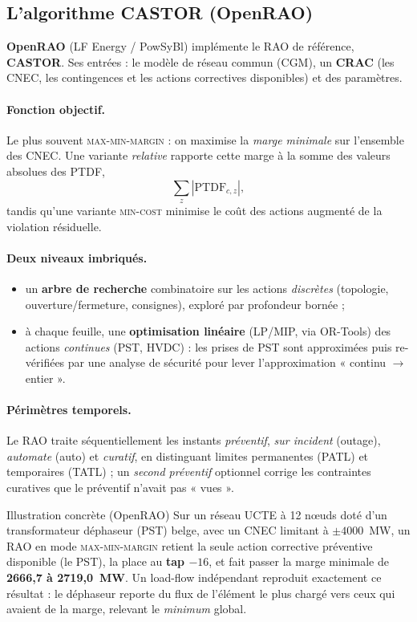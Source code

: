 \documentclass[11pt,a4paper]{article}
\newcommand{\PTDF}{\mathrm{PTDF}}
\begin{document}
\subsection{L'algorithme CASTOR (OpenRAO)}

\textbf{OpenRAO} (LF Energy / PowSyBl) implémente le RAO de référence,
\textbf{CASTOR}. Ses entrées : le modèle de réseau commun (CGM), un
\textbf{CRAC} (les CNEC, les contingences et les actions correctives
disponibles) et des paramètres.

\paragraph{Fonction objectif.} Le plus souvent \textsc{max-min-margin} :
on maximise la \emph{marge minimale} sur l'ensemble des CNEC. Une variante
\emph{relative} rapporte cette marge à la somme des valeurs absolues des
PTDF,
\[
  \textstyle\sum_z |\PTDF_{c,z}| ,
\]
tandis qu'une variante \textsc{min-cost} minimise le coût des actions
augmenté de la violation résiduelle.

\paragraph{Deux niveaux imbriqués.}
\begin{itemize}[nosep,leftmargin=1.4em]
  \item un \textbf{arbre de recherche} combinatoire sur les actions
        \emph{discrètes} (topologie, ouverture/fermeture, consignes),
        exploré par profondeur bornée ;
  \item à chaque feuille, une \textbf{optimisation linéaire} (LP/MIP, via
        OR-Tools) des actions \emph{continues} (PST, HVDC) : les prises de
        PST sont approximées puis re-vérifiées par une analyse de sécurité
        pour lever l'approximation « continu $\to$ entier ».
\end{itemize}

\paragraph{Périmètres temporels.} Le RAO traite séquentiellement les
instants \emph{préventif}, \emph{sur incident} (outage), \emph{automate}
(auto) et \emph{curatif}, en distinguant limites permanentes (PATL) et
temporaires (TATL) ; un \emph{second préventif} optionnel corrige les
contraintes curatives que le préventif n'avait pas « vues ».

\begin{rembox}{Illustration concrète (OpenRAO)}
Sur un réseau UCTE à 12 n\oe{}uds doté d'un transformateur déphaseur (PST)
belge, avec un CNEC limitant à $\pm4000$~MW, un RAO en mode
\textsc{max-min-margin} retient la seule action corrective préventive
disponible (le PST), la place au \textbf{tap $-16$}, et fait passer la marge
minimale de \textbf{2666{,}7 à 2719{,}0~MW}. Un load-flow indépendant
reproduit exactement ce résultat : le déphaseur reporte du flux de l'élément
le plus chargé vers ceux qui avaient de la marge, relevant le \emph{minimum}
global.
\end{rembox}
\end{document}
